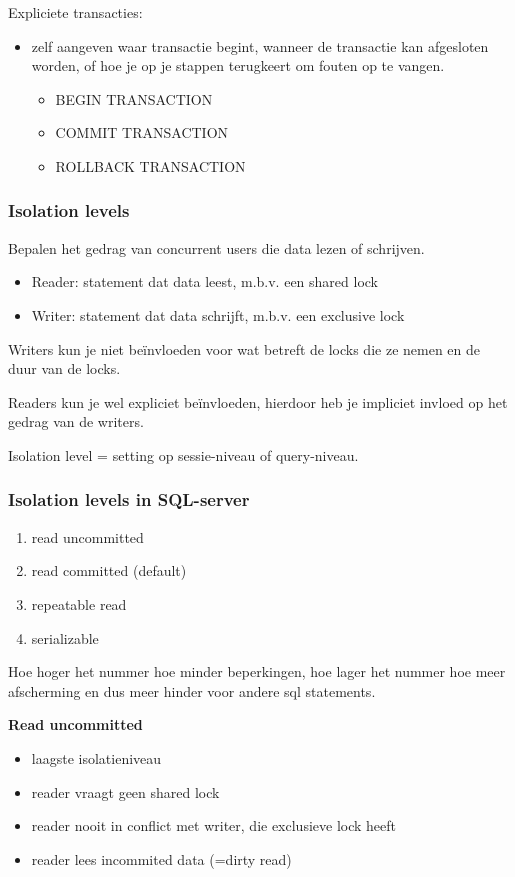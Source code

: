 \documentclass[a4paper,12pt]{article}
\begin{document}
Expliciete transacties:
\begin{itemize}
\item zelf aangeven waar transactie begint, wanneer de transactie kan afgesloten worden, of hoe je op je stappen terugkeert om fouten op te vangen.
	\begin{itemize}
	\item BEGIN TRANSACTION
	\item COMMIT TRANSACTION
	\item ROLLBACK TRANSACTION
	\end{itemize}
\end{itemize}

\subsubsection{Isolation levels}
Bepalen het gedrag van concurrent users die data lezen of schrijven.
\begin{itemize}
\item Reader: statement dat data leest, m.b.v. een shared lock
\item Writer: statement dat data schrijft, m.b.v. een exclusive lock
\end{itemize}
Writers kun je niet beïnvloeden voor wat betreft de locks die ze nemen en de duur van de locks.

Readers kun je wel expliciet beïnvloeden, hierdoor heb je impliciet invloed op het gedrag van de writers.

Isolation level = setting op sessie-niveau of query-niveau.

\subsubsection{Isolation levels in SQL-server}

\begin{enumerate}
\item read uncommitted
\item read committed (default)
\item repeatable read
\item serializable
\end{enumerate}

Hoe hoger het nummer hoe minder beperkingen, hoe lager het nummer hoe meer afscherming en dus meer hinder voor andere sql statements.

\textbf{Read uncommitted}
\begin{itemize}
\item laagste isolatieniveau
\item reader vraagt geen shared lock
\item reader nooit in conflict met writer, die exclusieve lock heeft
\item reader lees incommited data (=dirty read)
\end{itemize}
\end{document}
